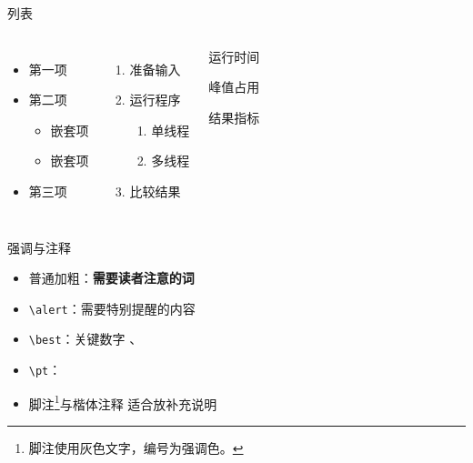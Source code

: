\documentclass[aspectratio=169,10pt]{beamer}
\begin{document}
\begin{frame}{列表}
  \small
  \begin{columns}[T,onlytextwidth]
      \par\vspace{1.5mm}
      \begin{itemize}
        \item 第一项
        \item 第二项
          \begin{itemize}
            \item 嵌套项
            \item 嵌套项
          \end{itemize}
        \item 第三项
      \end{itemize}
      \par\vspace{1.5mm}
      \begin{enumerate}
        \item 准备输入
        \item 运行程序
          \begin{enumerate}
            \item 单线程
            \item 多线程
          \end{enumerate}
        \item 比较结果
      \end{enumerate}
      \par\vspace{1.5mm}
      \begin{description}[速度]
        \item[速度] 运行时间
        \item[内存] 峰值占用
        \item[质量] 结果指标
      \end{description}
  \end{columns}
\end{frame}

\begin{frame}{强调与注释}
  \small
  \begin{itemize}\setlength{\itemsep}{2.4mm}
    \item 普通加粗：\textbf{需要读者注意的词}
    \item \texttt{\textbackslash alert}：\alert{需要特别提醒的内容}
    \item \texttt{\textbackslash best}：关键数字 、
    \item \texttt{\textbackslash pt}：
    \item 脚注\footnote{脚注使用灰色文字，编号为强调色。}与楷体注释 {\kai 适合放补充说明}
  \end{itemize}
\end{frame}
\end{document}
